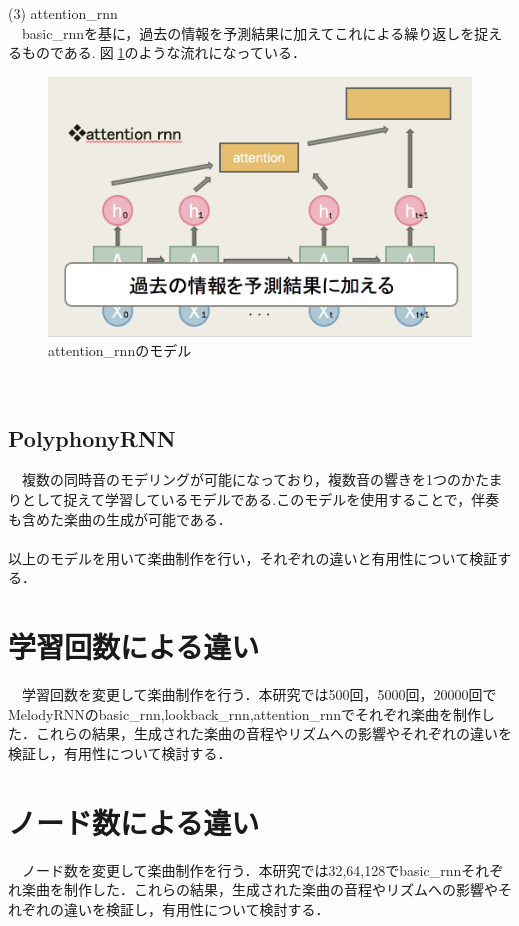 \newpage
(3) attention\_rnn\\
　basic\_rnnを基に，過去の情報を予測結果に加えてこれによる繰り返しを捉えるものである.図\ref{fig:attentio_rnnのモデル}のような流れになっている．
\begin{figure}[!ht]
    \begin{screen}
    \begin{center}
        \includegraphics[scale=0.8,clip]{./img/attention1.png}
        \caption{attention\_rnnのモデル}
        \label{fig:attentio_rnnのモデル}
    \end{center}
    \end{screen}
\end{figure}\\
\subsection{PolyphonyRNN}
　複数の同時音のモデリングが可能になっており，複数音の響きを1つのかたまりとして捉えて学習しているモデルである.このモデルを使用することで，伴奏も含めた楽曲の生成が可能である．\\
\\
以上のモデルを用いて楽曲制作を行い，それぞれの違いと有用性について検証する．
\newpage
\section{学習回数による違い}
　学習回数を変更して楽曲制作を行う．本研究では500回，5000回，20000回でMelodyRNNのbasic\_rnn,lookback\_rnn,attention\_rnnでそれぞれ楽曲を制作した．これらの結果，生成された楽曲の音程やリズムへの影響やそれぞれの違いを検証し，有用性について検討する．
\section{ノード数による違い}
　ノード数を変更して楽曲制作を行う．本研究では32,64,128でbasic\_rnnそれぞれ楽曲を制作した．これらの結果，生成された楽曲の音程やリズムへの影響やそれぞれの違いを検証し，有用性について検討する．